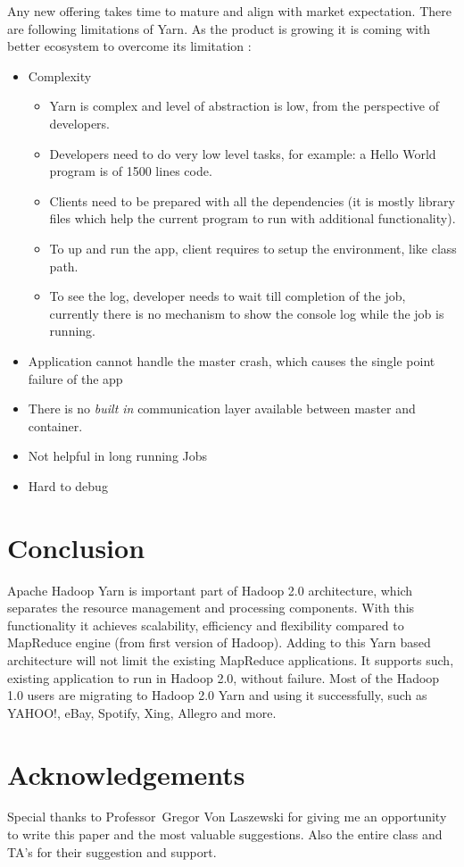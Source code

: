 \documentclass[9pt,twocolumn,twoside]{../../styles/osajnl}
\begin{document}
	Any new offering takes time to mature and align with market expectation. There are following limitations of Yarn. As the product is growing it is coming with better ecosystem to overcome its limitation \cite{www-5}: 
\begin{itemize}	
	
	\item Complexity  
		\begin{itemize}	
			\item Yarn is complex and level of abstraction is low, from the perspective of developers. 
			\item Developers need to do very low level tasks, for example:  a Hello World program is of 1500 lines code.
			\item Clients need to be prepared with all the dependencies (it is mostly library files which help the current program to run with additional functionality).
			\item To up and run the app, client requires to setup the environment, like class path. 
			\item To see the log, developer needs to wait till completion of the job, currently there is no mechanism to show the console log while the job is running.	
		\end{itemize}		
		

	\item Application cannot handle the master crash, which causes the single point failure of the app
	\item There is no \textit{built in} communication layer available between master and container.
	\item Not helpful in long running Jobs
	\item Hard to debug
	
\end{itemize}
	
\section{Conclusion}

Apache Hadoop Yarn is important part of Hadoop 2.0 architecture, which separates the resource management and processing components. With this functionality it achieves scalability, efficiency and flexibility compared to MapReduce engine (from first version of Hadoop). Adding to this Yarn based architecture will not limit the existing MapReduce applications. It supports such, existing application to run in Hadoop 2.0, without failure. Most of the Hadoop 1.0 users are migrating to Hadoop 2.0 Yarn and using it successfully, such as YAHOO!, eBay, Spotify, Xing, Allegro and more.

\section*{Acknowledgements}

Special thanks to Professor Gregor Von Laszewski for giving me an opportunity to write this paper and the most valuable suggestions. Also the entire class and TA’s for their suggestion and support.



 
\end{document}
